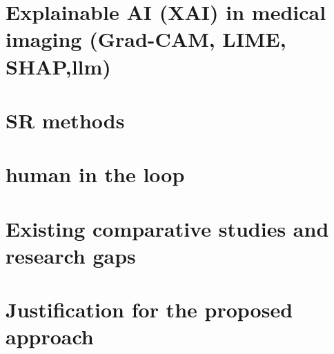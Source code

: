 \section{Explainable AI (XAI) in medical imaging (Grad-CAM, LIME, SHAP,llm)}

\section{SR methods}
\section{human in the loop}
\section{Existing comparative studies and research gaps}

\section{Justification for the proposed approach}
\



